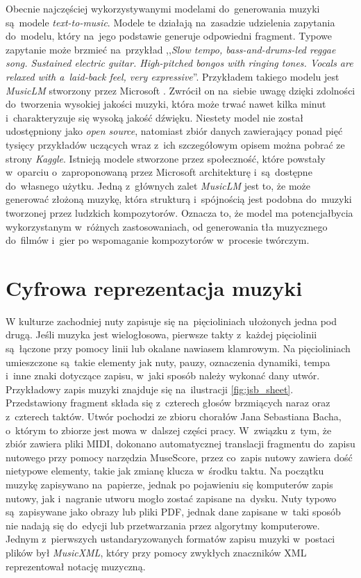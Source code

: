 \documentclass[data-science]{agh-wi} %
\begin{document}
Obecnie najczęściej wykorzystywanymi modelami do~generowania muzyki są~modele \textit{text-to-music}. Modele te działają na~zasadzie udzielenia zapytania do~modelu, który na~jego podstawie generuje odpowiedni fragment. Typowe zapytanie może brzmieć na~przykład ,,\textit{Slow tempo, bass-and-drums-led reggae song. Sustained electric guitar. High-pitched bongos with ringing tones. Vocals are relaxed with a~laid-back feel, very expressive}''. Przykładem takiego modelu jest \textit{MusicLM} stworzony przez Microsoft \cite*{agostinelli2023musiclm}. Zwrócił on na~siebie uwagę dzięki zdolności do~tworzenia wysokiej jakości muzyki, która może trwać nawet kilka minut i~charakteryzuje się wysoką jakość dźwięku. Niestety model nie został udostępniony jako \textit{open source}, natomiast zbiór danych zawierający ponad pięć tysięcy przykładów uczących wraz z~ich szczegółowym opisem można pobrać ze strony \textit{Kaggle}. Istnieją modele stworzone przez społeczność, które powstały w~oparciu o~zaproponowaną przez Microsoft architekturę i~są~dostępne do~własnego użytku. Jedną z~głównych zalet \textit{MusicLM} jest to, że może generować złożoną muzykę, która strukturą i~spójnością jest podobna do~muzyki tworzonej przez ludzkich kompozytorów. Oznacza to, że model ma potencjałbycia wykorzystanym w~różnych zastosowaniach, od generowania tła muzycznego do~filmów i~gier po wspomaganie kompozytorów w~procesie twórczym.


\section{Cyfrowa reprezentacja muzyki}\label{sec:muzyka_cyfrowa}
W kulturze zachodniej nuty zapisuje się na~pięcioliniach ułożonych jedna pod drugą. Jeśli muzyka jest wielogłosowa, pierwsze takty z~każdej pięciolinii są~łączone przy pomocy linii lub okalane nawiasem klamrowym. Na pięcioliniach umieszczone są~takie elementy jak nuty, pauzy, oznaczenia dynamiki, tempa i~inne znaki dotyczące zapisu, w~jaki sposób należy wykonać dany utwór. Przykładowy zapis muzyki znajduje się na~ilustracji \ref*{fig:jsb_sheet}. Przedstawiony fragment składa się z~czterech głosów brzmiących naraz oraz z~czterech taktów. Utwór pochodzi ze zbioru chorałów Jana Sebastiana Bacha, o~którym to zbiorze jest mowa w~dalszej części pracy. W~związku z~tym, że zbiór zawiera pliki MIDI, dokonano automatycznej translacji fragmentu do~zapisu nutowego przy pomocy narzędzia MuseScore, przez co~zapis nutowy zawiera dość nietypowe elementy, takie jak zmianę klucza w~środku taktu. Na początku muzykę zapisywano na~papierze, jednak po pojawieniu się komputerów zapis nutowy, jak i~nagranie utworu mogło zostać zapisane na~dysku. Nuty typowo są~zapisywane jako obrazy lub pliki PDF, jednak dane zapisane w~taki sposób nie nadają się do~edycji lub przetwarzania przez algorytmy komputerowe. Jednym z~pierwszych ustandaryzowanych formatów zapisu muzyki w~postaci plików był \textit{MusicXML}, który przy pomocy zwykłych znaczników XML reprezentował notację muzyczną.
\end{document}
